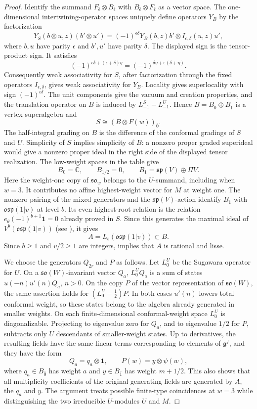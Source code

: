 \documentclass[11pt,a4paper]{amsart}
\numberwithin{equation}{section}
\theoremstyle{definition}
\theoremstyle{remark}
\newcommand{\g}{\mathfrak g}
\newcommand{\sog}{\mathfrak{so}}
\begin{document}
\begin{proof}
Identify the summand $F_{\bar\epsilon}\otimes B_{\bar\epsilon}$
with $B_{\bar\epsilon}\otimes F_{\bar\epsilon}$ as a vector space.
The one-dimensional intertwining-operator spaces uniquely define
operators $Y_B$ by the factorization
$$
 Y_S(b\otimes u,z)(b'\otimes u')
 =(-1)^{\epsilon\delta}
    Y_B(b,z)b'\otimes I_{\epsilon,\delta}(u,z)u',
$$
where $b,u$ have parity $\epsilon$ and $b',u'$ have parity $\delta$.
The displayed sign is the tensor-product sign. It satisfies
$$
 (-1)^{\epsilon\delta+(\epsilon+\delta)\eta}
 =(-1)^{\delta\eta+\epsilon(\delta+\eta)}.
$$
Consequently weak associativity for $S$, after factorization through
the fixed operators $I_{\epsilon,\delta}$, gives weak associativity
for $Y_B$. Locality gives superlocality with sign
$(-1)^{\epsilon\delta}$. The unit components give the vacuum and
creation properties, and the translation operator on $B$ is
induced by $L^S_{-1}-L^U_{-1}$. Hence
$B=B_{\overline0}\oplus B_{\overline1}$ is a vertex superalgebra and
$$
 S\cong(B\otimes F(w))_{\overline0}.
$$
The half-integral grading on $B$ is the difference of the conformal
gradings of $S$ and $U$. Simplicity of $S$ implies simplicity of $B$:
a nonzero proper graded superideal would give a nonzero proper ideal
in the right side of the displayed tensor realization. The low-weight spaces in the table give
$$
 B_0=\mathbb C,\qquad B_{1/2}=0,\qquad
 B_1=\mathfrak{sp}(V)\oplus\Pi V.
$$
Here the weight-one copy of $\sog_w$ belongs to the $U$-summand,
including when $w=3$. It contributes no affine highest-weight vector for $M$
at weight one.
The nonzero pairing of the mixed generators and the $\mathfrak{sp}(V)$-action identify $B_1$ with
$\mathfrak{osp}(1|v)$ at level $b$. Its even highest-root relation is
the relation $e_\theta(-1)^{b+1}\mathbf1=0$ already proved in $S$.
Since this generates the maximal ideal of
$V^b(\mathfrak{osp}(1|v))$ (see \cite[Section~4]{JiangWang2022}), it gives
$$
 A=L_b(\mathfrak{osp}(1|v))\subset B.
$$
Since $b\ge1$ and $v/2\ge1$ are integers,
\cite[Theorem~7.1]{CL} implies that $A$ is rational and lisse.

We choose the generators $Q_{2r}$ and $P$ as follows.
Let $L_0^U$ be the Sugawara operator for $U$. On a $\mathfrak{so}(W)$-invariant vector $Q_a$, $L_0^UQ_a$ is a sum of states $u(-n)u'(n)Q_a$, $n>0$.
On the copy $P$ of the vector representation of $\mathfrak{so}(W)$, the same assertion holds for
$(L_0^U-\frac12)P$. In both cases $u'(n)$ lowers total conformal
weight, so these states belong to the algebra already generated in
smaller weights. On each finite-dimensional conformal-weight space
$L_0^U$ is diagonalizable. Projecting to eigenvalue zero for $Q_a$,
and to eigenvalue $1/2$ for $P$, subtracts only $U$ descendants of
smaller-weight states. Up to derivatives, the resulting fields have
the same linear terms corresponding to elements of $\g^f$, and they
have the form
$$
 Q_a=q_a\otimes\mathbf1,
 \qquad P(w)=y\otimes\psi(w),
$$
where $q_a\in B_{\overline0}$ has weight $a$ and
$y\in B_{\overline1}$ has weight $m+1/2$.
This also shows that all multiplicity coefficients of the original
generating fields are generated by $A$, the $q_a$ and $y$.
The argument treats possible finite-type coincidences at $w=3$
while distinguishing the two irreducible $U$-modules $U$ and $M$.


\end{proof}
\end{document}
